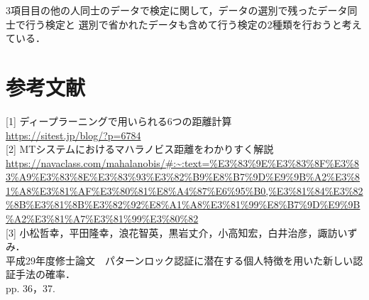     3項目目の他の人同士のデータで検定に関して，データの選別で残ったデータ同士で行う検定と
    選別で省かれたデータも含めて行う検定の2種類を行おうと考えている．

\section{参考文献}
    [1] ディープラーニングで用いられる6つの距離計算 \\
    \url{https://sitest.jp/blog/?p=6784} \\

    [2] MTシステムにおけるマハラノビス距離をわかりすく解説 \\
    \url{https://navaclass.com/mahalanobis/#:~:text=%E3%83%9E%E3%83%8F%E3%83%A9%E3%83%8E%E3%83%93%E3%82%B9%E8%B7%9D%E9%9B%A2%E3%81%A8%E3%81%AF%E3%80%81%E8%A4%87%E6%95%B0,%E3%81%84%E3%82%8B%E3%81%8B%E3%82%92%E8%A1%A8%E3%81%99%E8%B7%9D%E9%9B%A2%E3%81%A7%E3%81%99%E3%80%82}\\

    [3] 小松哲幸，平田隆幸，浪花智英，黒岩丈介，小高知宏，白井治彦，諏訪いずみ．\\
        平成29年度修士論文　パターンロック認証に潜在する個人特徴を用いた新しい認証手法の確率．\\
        pp. 36，37.\\

